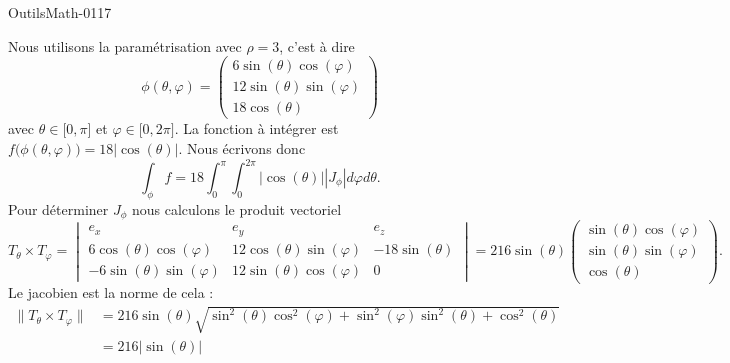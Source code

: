 
\begin{corrige}{OutilsMath-0117}

    Nous utilisons la paramétrisation avec \( \rho=3\), c'est à dire
    \begin{equation}
        \phi(\theta,\varphi)=\begin{pmatrix}
            6\sin(\theta)\cos(\varphi)    \\ 
            12\sin(\theta)\sin(\varphi)    \\ 
            18\cos(\theta)    
        \end{pmatrix}
    \end{equation}
    avec \( \theta\in\mathopen[ 0 , \pi \mathclose]\) et \( \varphi\in\mathopen[ 0 , 2\pi \mathclose]\). La fonction à intégrer est \( f\big( \phi(\theta,\varphi) \big)=18| \cos(\theta) |\). Nous écrivons donc
    \begin{equation}
        \int_{\phi}f=18\int_0^{\pi}\int_0^{2\pi}| \cos(\theta) | |J_{\phi} |d\varphi d\theta.
    \end{equation}
    Pour déterminer \( J_{\phi}\) nous calculons le produit vectoriel
    \begin{equation}
        T_{\theta}\times T_{\varphi}=\begin{vmatrix}
            e_x    &   e_y    &   e_z    \\
            6\cos(\theta)\cos(\varphi)    &  12\cos(\theta)\sin(\varphi)     &   -18\sin(\theta)    \\
            -6\sin(\theta)\sin(\varphi)    &   12\sin(\theta)\cos(\varphi)    &   0
        \end{vmatrix}=216\sin(\theta)\begin{pmatrix}
            \sin(\theta)\cos(\varphi)    \\ 
            \sin(\theta)\sin(\varphi)    \\ 
            \cos(\theta)    
        \end{pmatrix}.
    \end{equation}
    Le jacobien est la norme de cela :
    \begin{subequations}
        \begin{align}
            \| T_{\theta}\times T_{\varphi} \|&=216\sin(\theta)\sqrt{\sin^2(\theta)\cos^2(\varphi)+\sin^2(\varphi)\sin^2(\theta)+\cos^2(\theta)}\\
            &=216|\sin(\theta)|\\

\end{align}
\end{subequations}
\end{corrige}
